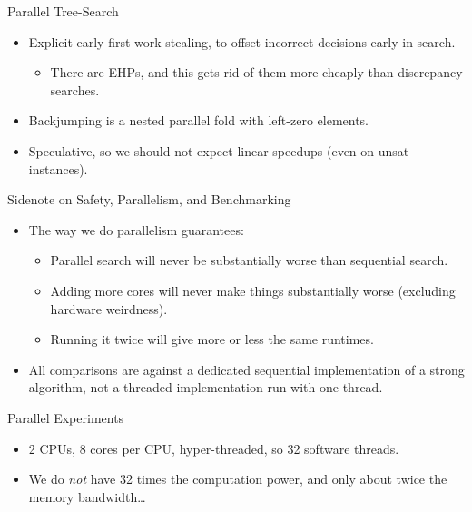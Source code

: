 \documentclass{beamer}
\begin{document}
\begin{frame}{Parallel Tree-Search}
     {
        \begin{itemize}
            \item Explicit early-first work stealing, to offset incorrect decisions early in search.
                \begin{itemize}
                    \item There are EHPs, and this gets rid of them more cheaply than discrepancy
                        searches.
                \end{itemize}
            \item Backjumping is a nested parallel fold with left-zero elements.
            \item Speculative, so we should not expect linear speedups (even on unsat instances).
        \end{itemize}
    }
\end{frame}

\begin{frame}{Sidenote on Safety, Parallelism, and Benchmarking}
    \begin{itemize}
        \item The way we do parallelism guarantees:
            \begin{itemize}
                \item Parallel search will never be substantially worse than sequential search.
                \item Adding more cores will never make things substantially worse (excluding
                    hardware weirdness).
                \item Running it twice will give more or less the same runtimes.
            \end{itemize}
        \item All comparisons are against a dedicated sequential implementation of a strong
            algorithm, not a threaded implementation run with one thread.
    \end{itemize}
\end{frame}

\begin{frame}{Parallel Experiments}
    \begin{itemize}
        \item 2 CPUs, 8 cores per CPU, hyper-threaded, so 32 software threads.
        \item We do \emph{not} have 32 times the computation power, and only about twice the memory
            bandwidth\ldots
    \end{itemize}
\end{frame}
\end{document}

